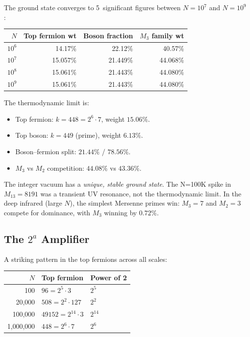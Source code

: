 \documentclass[11pt,a4paper]{article}
\begin{document}
\begin{observation}
\label{obs:fixedpoint}
The ground state converges to 5~significant figures between
$N = 10^7$ and $N = 10^9$:
\begin{center}
\begin{tabular}{@{}rrrr@{}}
\toprule
$N$ & Top fermion wt & Boson fraction & $M_3$ family wt \\
\midrule
$10^6$ & 14.17\% & 22.12\% & 40.57\% \\
$10^7$ & 15.057\% & 21.449\% & 44.068\% \\
$10^8$ & 15.061\% & 21.443\% & 44.080\% \\
$10^9$ & 15.061\% & 21.443\% & 44.080\% \\
\bottomrule
\end{tabular}
\end{center}
The thermodynamic limit is:
\begin{itemize}
  \item Top fermion: $k = 448 = 2^6 \cdot 7$, weight $15.06\%$.
  \item Top boson: $k = 449$ (prime), weight $6.13\%$.
  \item Boson--fermion split: $21.44\%$ / $78.56\%$.
  \item $M_3$ vs $M_2$ competition: $44.08\%$ vs $43.36\%$.
\end{itemize}
\end{observation}

The integer vacuum has a \emph{unique, stable ground state}.
The N=100K spike in $M_{13} = 8191$ was a transient UV resonance,
not the thermodynamic limit. In the deep infrared (large $N$),
the simplest Mersenne primes win: $M_3 = 7$ and $M_2 = 3$
compete for dominance, with $M_3$ winning by $0.72\%$.

\subsection{The $2^a$ Amplifier}

A striking pattern in the top fermions across all scales:
\begin{center}
\begin{tabular}{@{}rll@{}}
\toprule
$N$ & Top fermion & Power of 2 \\
\midrule
100     & $96 = 2^5 \cdot 3$       & $2^5$  \\
20{,}000   & $508 = 2^2 \cdot 127$    & $2^2$  \\
100{,}000  & $49152 = 2^{14} \cdot 3$ & $2^{14}$ \\
1{,}000{,}000 & $448 = 2^6 \cdot 7$      & $2^6$  \\
\bottomrule
\end{tabular}
\end{center}
\end{document}
